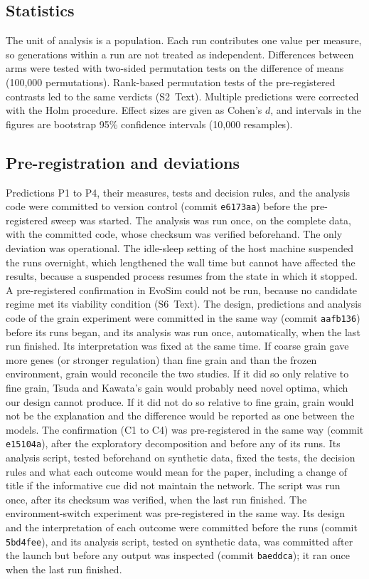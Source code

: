 \documentclass[10pt,letterpaper]{article}
\begin{document}
\subsection*{Statistics}
The unit of analysis is a population. Each run contributes one value per
measure, so generations within a run are not treated as independent. Differences
between arms were tested with two-sided permutation tests on the difference of
means (100{,}000 permutations). Rank-based permutation tests of the
pre-registered contrasts led to the same verdicts (S2~Text). Multiple predictions were corrected with the Holm procedure. Effect
sizes are given as Cohen's $d$, and intervals in the figures are bootstrap 95\%
confidence intervals (10{,}000 resamples).

\subsection*{Pre-registration and deviations}
Predictions P1 to P4, their measures, tests and decision rules, and the analysis
code were committed to version control (commit \texttt{e6173aa}) before the
pre-registered sweep was started. The analysis was run once, on the complete
data, with the committed code, whose checksum was verified beforehand. The only
deviation was operational. The idle-sleep setting of the host machine suspended
the runs overnight, which lengthened the wall time but cannot have affected the
results, because a suspended process resumes from the state in which it
stopped. A pre-registered confirmation in EvoSim could not be run, because
no candidate regime met its viability condition (S6~Text). The design, predictions and analysis code of the
grain experiment were committed in the same way (commit \texttt{aafb136}) before
its runs began, and its analysis was run once, automatically, when the last run
finished. Its interpretation was fixed at the same time. If coarse grain gave
more genes (or stronger regulation) than fine grain and than the frozen
environment, grain would reconcile the two studies. If it did so only relative to
fine grain, Tsuda and Kawata's gain would probably need novel optima, which our
design cannot produce. If it did not do so relative to fine grain, grain would
not be the explanation and the difference would be reported as one between the
models. The confirmation (C1 to C4) was pre-registered in the same way (commit
\texttt{e15104a}), after the exploratory decomposition and before any of its
runs. Its analysis script, tested beforehand on synthetic data, fixed the tests,
the decision rules and what each outcome would mean for the paper, including a
change of title if the informative cue did not maintain the network. The script
was run once, after its checksum was verified, when the last run finished. The
environment-switch experiment was pre-registered in the same way. Its design and
the interpretation of each outcome were committed before the runs (commit
\texttt{5bd4fee}), and its analysis script, tested on synthetic data, was
committed after the launch but before any output was inspected (commit
\texttt{baeddca}); it ran once when the last run finished.
\end{document}
